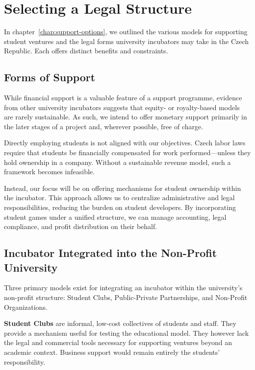 \section{Selecting a Legal Structure}
In chapter~\ref{chap:support-options}, we outlined the various models for supporting student ventures and the legal forms university incubators may take in the Czech Republic. Each offers distinct benefits and constraints.

\subsection{Forms of Support}
While financial support is a valuable feature of a support programme, evidence from other university incubators suggests that equity- or royalty-based models are rarely sustainable. As such, we intend to offer monetary support primarily in the later stages of a project and, wherever possible, free of charge.

Directly employing students is not aligned with our objectives. Czech labor laws require that students be financially compensated for work performed—unless they hold ownership in a company. Without a sustainable revenue model, such a framework becomes infeasible.

Instead, our focus will be on offering mechanisms for student ownership within the incubator. This approach allows us to centralize administrative and legal responsibilities, reducing the burden on student developers. By incorporating student games under a unified structure, we can manage accounting, legal compliance, and profit distribution on their behalf.

\subsection{Incubator Integrated into the Non-Profit University}
Three primary models exist for integrating an incubator within the university’s non-profit structure: Student Clubs, Public-Private Partnerships, and Non-Profit Organizations.

\textbf{Student Clubs} are informal, low-cost collectives of students and staff. They provide a mechanism useful for testing the educational model. They however lack the legal and commercial tools necessary for supporting ventures beyond an academic context. Business support would remain entirely the students’ responsibility.

